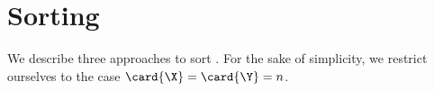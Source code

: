 \chapter{Sorting \XY}

We describe three approaches to sort \XY.
For the sake of simplicity, we restrict ourselves to the case $\card{\X} = \card{\Y} = n$.
